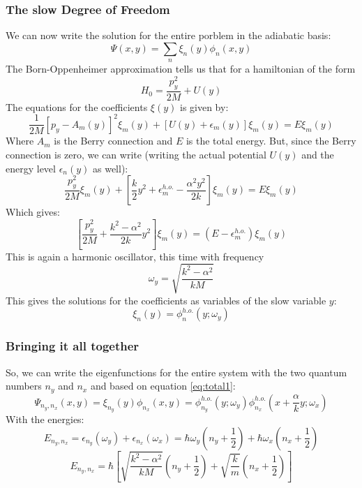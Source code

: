 \documentclass{article}
\begin{document}
\subsubsection{The slow Degree of Freedom}
We can now write the solution for the entire porblem in the adiabatic basis:
\begin{equation}
\label{eq:total1}
    \Psi(x, y) = \sum_n \xi_n(y) \phi_n(x, y)
\end{equation}
The Born-Oppenheimer approximation tells us that for a hamiltonian of the form
\begin{equation}
    H_0 = \frac{p_y^2}{2M} + U(y)
\end{equation}
The equations for the coefficients $\xi(y)$ is given by:
\begin{equation}
    \frac{1}{2M}\left[p_y - A_m(y)\right]^2\xi_m(y) + \left[U(y) + \epsilon_m(y)\right]\xi_m(y) = E \xi_m(y)
\end{equation}
Where $A_m$ is the Berry connection and $E$ is the total energy. But, since the Berry connection is zero, we can write (writing the actual potential $U(y)$ and the energy level $\epsilon_n(y)$ as well):
\begin{equation}
    \frac{p_y^2}{2M}\xi_m(y) + \left[\frac{k}{2}y^2 + \epsilon_m^{h.o.} - \frac{\alpha^2y^2}{2k}\right]\xi_m(y) = E \xi_m(y)
\end{equation}
Which gives:
\begin{equation}
    \left[\frac{p_y^2}{2M} + \frac{k^2 - \alpha^2}{2k}y^2\right]\xi_m(y) = \left(E - \epsilon_m^{h.o.}\right) \xi_m(y)
\end{equation}
This is again a harmonic oscillator, this time with frequency
\begin{equation}
    \omega_y = \sqrt{\frac{k^2 - \alpha^2}{kM}}
\end{equation}
This gives the solutions for the coefficients as variables of the slow variable $y$:
\begin{equation}
    \xi_n(y) = \phi_n^{h.o.}(y;\omega_y)
\end{equation}
\subsubsection{Bringing it all together}
So, we can write the eigenfunctions for the entire system with the two quantum numbers $n_y$ and $n_x$ and based on equation \ref{eq:total1}:
\begin{equation}
    \Psi_{n_y,n_x} (x, y) = \xi_{n_y}(y) \phi_{n_x}(x, y) = \phi_{n_y}^{h.o.}(y;\omega_y)  \phi_{n_x}^{h.o.}\left(x + \frac{\alpha}{k} y; \omega_x\right)
\end{equation}
With the energies:
\begin{equation}
    E_{n_y,n_x} = \epsilon_{n_y}(\omega_y) + \epsilon_{n_x}(\omega_x) = \hbar\omega_y\left(n_y + \frac{1}{2}\right) + \hbar\omega_x\left(n_x + \frac{1}{2}\right)
\end{equation}
\begin{equation}
    E_{n_y,n_x} = \hbar\left[\sqrt{\frac{k^2 - \alpha^2}{kM}}\left(n_y + \frac{1}{2}\right) + \sqrt{\frac{k}{m}}\left(n_x + \frac{1}{2}\right)\right]
\end{equation}
\end{document}
